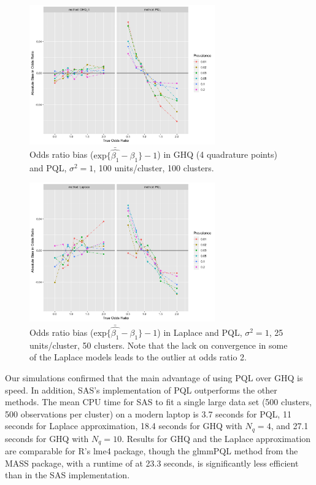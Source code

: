 \documentclass{article}
\begin{document}
\begin{flushleft}
\begin{figure}[]
\begin{center}
\includegraphics[width=8cm]{_bias_pql_ghq4.png}
  \caption{Odds ratio bias ($\text{exp} \{ \bar{\hat{\beta_1}} - \beta_1 \} - 1$) in GHQ (4 quadrature points) and PQL, $\sigma^2=1$, 100 units/cluster, 100 clusters.}
  \label{fig:_bias_pql_ghq4}
\end{center}
\end{figure}

\begin{figure}[]
\begin{center}
\includegraphics[width=8cm]{_bias_pql_lap.png}
  \caption{Odds ratio bias ($\text{exp} \{ \bar{\hat{\beta_1}} - \beta_1 \} - 1$) in Laplace and PQL, $\sigma^2=1$, 25 units/cluster, 50 clusters. Note that the lack on convergence in some of the Laplace models leads to the outlier at odds ratio 2.}
  \label{fig:_bias_pql_lap}
\end{center}
\end{figure}


Our simulations confirmed that the main advantage of using PQL over GHQ is speed.  In addition, SAS's implementation of PQL outperforms the other methods. The mean CPU time for SAS to fit a single large data set (500 clusters, 500 observations per cluster) on a modern laptop is 3.7 seconds for PQL, 11 seconds for Laplace approximation, 18.4 seconds for GHQ with $N_q=4$, and 27.1 seconds for GHQ with $N_q=10$. Results for GHQ and the Laplace approximation are comparable for R's lme4 package, though the glmmPQL method from the MASS package, with a runtime of at 23.3 seconds, is significantly less efficient than in the SAS implementation.


\end{flushleft}
\end{document}
